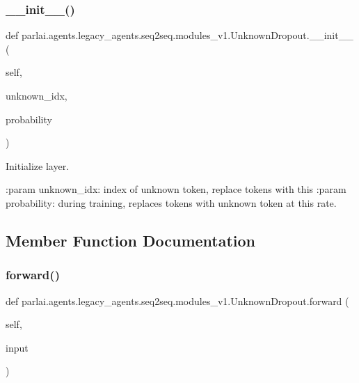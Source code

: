 \subsubsection{\texorpdfstring{\+\_\+\+\_\+init\+\_\+\+\_\+()}{\_\_init\_\_()}}
{\footnotesize\ttfamily def parlai.\+agents.\+legacy\+\_\+agents.\+seq2seq.\+modules\+\_\+v1.\+Unknown\+Dropout.\+\_\+\+\_\+init\+\_\+\+\_\+ (\begin{DoxyParamCaption}\item[{}]{self,  }\item[{}]{unknown\+\_\+idx,  }\item[{}]{probability }\end{DoxyParamCaption})}

\begin{DoxyVerb}Initialize layer.

:param unknown_idx: index of unknown token, replace tokens with this
:param probability: during training, replaces tokens with unknown token
            at this rate.
\end{DoxyVerb}
 

\subsection{Member Function Documentation}
\mbox{\label{classparlai_1_1agents_1_1legacy__agents_1_1seq2seq_1_1modules__v1_1_1UnknownDropout_a4527e73a4211e888db806e4526c0126e}} 
\subsubsection{\texorpdfstring{forward()}{forward()}}
{\footnotesize\ttfamily def parlai.\+agents.\+legacy\+\_\+agents.\+seq2seq.\+modules\+\_\+v1.\+Unknown\+Dropout.\+forward (\begin{DoxyParamCaption}\item[{}]{self,  }\item[{}]{input }\end{DoxyParamCaption})}

